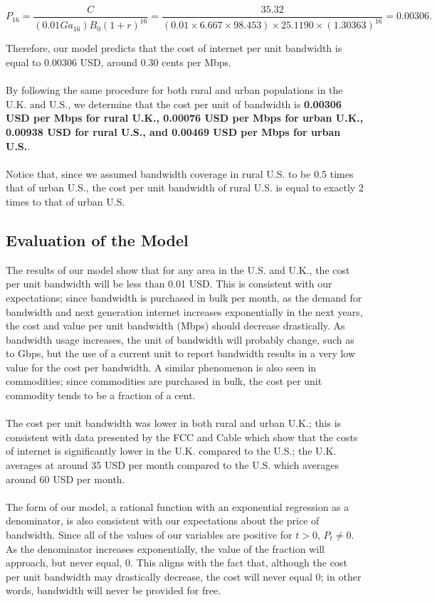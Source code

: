 \documentclass[12pt]{article}
\begin{document}
\begin{equation*}
    P_16 = \frac{C}{(0.01Ga_{16})B_0(1+r)^{16}} = \frac{35.32}{(0.01\times 6.667 \times 98.453)\times 25.1190 \times (1.30363)^{16}} = 0.00306.
\end{equation*}

Therefore, our model predicts that the cost of internet per unit bandwidth is equal to 0.00306 USD, around 0.30 cents per Mbps. 
\\
\\
By following the same procedure for both rural and urban populations in the U.K. and U.S., we determine that the cost per unit of bandwidth is \textbf{0.00306 USD per Mbps for rural U.K., 0.00076 USD per Mbps for urban U.K., 0.00938 USD for rural U.S., and 0.00469 USD per Mbps for urban U.S.}.
\\
\\
Notice that, since we assumed bandwidth coverage in rural U.S. to be 0.5 times that of urban U.S., the cost per unit bandwidth of rural U.S. is equal to exactly 2 times to that of urban U.S.
\subsection{Evaluation of the Model}

The results of our model show that for any area in the U.S. and U.K., the cost per unit bandwidth will be less than 0.01 USD. This is consistent with our expectations; since bandwidth is purchased in bulk per month, as the demand for bandwidth and next generation internet increases exponentially in the next years, the cost and value per unit bandwidth (Mbps) should decrease drastically. As bandwidth usage increases, the unit of bandwidth will probably change, such as to Gbps, but the use of a current unit to report bandwidth results in a very low value for the cost per bandwidth. A similar phenomenon is also seen in commodities; since commodities are purchased in bulk, the cost per unit commodity tends to be a fraction of a cent. 
\\
\\
The cost per unit bandwidth was lower in both rural and urban U.K.; this is consistent with data presented by the FCC\cite{FCCData} and Cable\cite{CableUK} which show that the costs of internet is significantly lower in the U.K. compared to the U.S.; the U.K. averages at around 35 USD per month compared to the U.S. which averages around 60 USD per month. 
\\
\\
The form of our model, a rational function with an exponential regression as a denominator, is also consistent with our expectations about the price of bandwidth. Since all of the values of our variables are positive for $t>0$, $P_t\ne 0$. As the denominator increases exponentially, the value of the fraction will approach, but never equal, 0. This aligns with the fact that, although the cost per unit bandwidth may drastically decrease, the cost will never equal 0; in other words, bandwidth will never be provided for free. 
\end{document}
